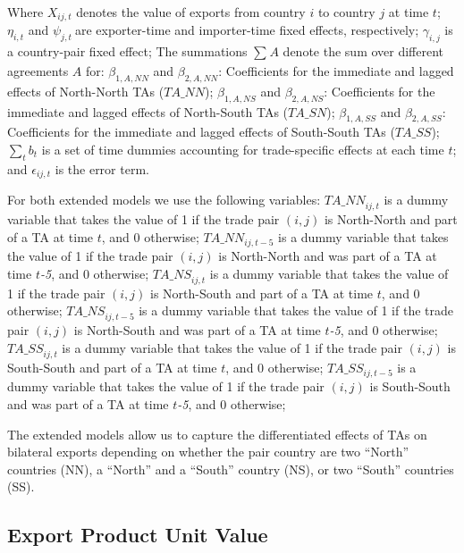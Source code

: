 \documentclass[12pt]{article}%
\begin{document}
Where \(X_{ij,t}\)\hspace{0pt} denotes the value of exports from country
\(i\) to country \(j\) at time \(t\); \(\eta_{i,t}\) and
\(\psi_{j,t}\ \)are exporter-time and importer-time fixed effects,
respectively; \(\gamma_{i,j}\) is a country-pair fixed effect;
The summations \hspace{0pt}\(\sum_{}^{}A\) denote the sum over different
agreements \(A\) for: \(\beta_{1,A,NN}\) and \(\beta_{2,A,NN}\):
Coefficients for the immediate and lagged effects of North-North TAs
\hspace{0pt}(\(TA\_ NN\)); \(\beta_{1,A,NS}\) and \(\beta_{2,A,NS}\):
Coefficients for the immediate and lagged effects of North-South TAs
(\(TA\_ SN\)); \(\beta_{1,A,SS}\) and \(\beta_{2,A,SS}\): Coefficients
for the immediate and lagged effects of South-South TAs (\(TA\_ SS\));
\(\sum_{t}^{}b_{t}\) is a set of time dummies accounting for
trade-specific effects at each time \(t\); and \(\epsilon_{ij,t}\) is
the error term.

For both extended models we use the following variables:
\({TA\_ NN}_{ij,t}\) is a dummy variable that takes the value of 1 if
the trade pair \((i,j)\) is North-North and part of a TA at time \(t\),
and 0 otherwise; \({TA\_ NN}_{ij,t - 5}\) is a dummy variable that takes
the value of 1 if the trade pair \((i,j)\) is North-North and was part
of a TA at time \(t\)\emph{-5}, and 0 otherwise; \({TA\_ NS}_{ij,t}\) is
a dummy variable that takes the value of 1 if the trade pair \((i,j)\)
is North-South and part of a TA at time \(t\), and 0 otherwise;
\({TA\_ NS}_{ij,t - 5}\) is a dummy variable that takes the value of 1
if the trade pair \((i,j)\) is North-South and was part of a TA at time
\(t\)\emph{-5}, and 0 otherwise; \({TA\_ SS}_{ij,t}\) is a dummy
variable that takes the value of 1 if the trade pair \((i,j)\) is
South-South and part of a TA at time \(t\), and 0 otherwise;
\({TA\_ SS}_{ij,t - 5}\) is a dummy variable that takes the value of 1
if the trade pair \((i,j)\) is South-South and was part of a TA at time
\(t\)\emph{-5}, and 0 otherwise;

The extended models allow us to capture the differentiated effects of
TAs on bilateral exports depending on whether the pair country are two
``North'' countries (NN), a ``North'' and a ``South'' country (NS), or
two ``South'' countries (SS).

%
\subsection{Export Product Unit Value}%
\label{subsec:ExportProductUnitValue}%
\end{document}
